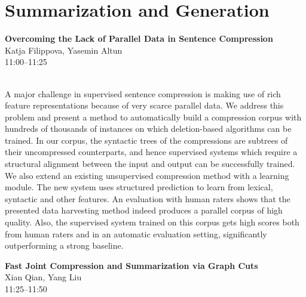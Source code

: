 \documentclass[twoside,makeidx]{book}
\begin{document}
\section{Summarization and Generation}
\vspace{-1em}
\par\vspace{2em}\noindent%
\begin{minipage}{\linewidth}%
\begin{center}
\textbf{\normalsize Overcoming the Lack of Parallel Data in Sentence Compression}\\
\normalsize  Katja Filippova,  Yasemin Altun\\
{\small 11:00--11:25}\\
\end{center}
\end{minipage}\\[0.5em]
\nopagebreak%
\noindent%
{\small A major challenge in supervised sentence compression is making use   of rich feature representations because of very scarce parallel   data.  We address this problem and present a method to automatically   build a compression corpus with hundreds of thousands of instances   on which deletion-based algorithms can be trained. In our corpus,   the syntactic trees of the compressions are subtrees of their   uncompressed counterparts, and hence supervised systems which   require a structural alignment between the input and output can be   successfully trained. We also extend an existing unsupervised   compression method with a learning module. The new system uses   structured prediction to learn from lexical, syntactic and   other features.   An evaluation with human raters shows that the presented data   harvesting method indeed produces a parallel corpus of high quality.   Also, the supervised system trained on this corpus gets high scores   both from human raters and in an automatic evaluation setting,   significantly outperforming a strong baseline.}
\par\vspace{2em}\noindent%
\begin{minipage}{\linewidth}%
\begin{center}
\textbf{\normalsize Fast Joint Compression and Summarization via Graph Cuts}\\
\normalsize  Xian Qian,  Yang Liu\\
{\small 11:25--11:50}\\
\end{center}
\end{minipage}\\[0.5em]
\end{document}
